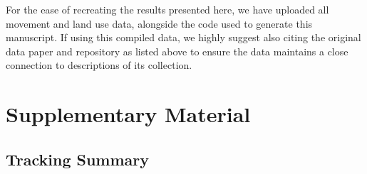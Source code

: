 \documentclass[10pt,a4paper]{article}
\begin{document}
For the ease of recreating the results presented here, we have uploaded all movement and land use data, alongside the code used to generate this manuscript.
If using this compiled data, we highly suggest also citing the original data paper and repository as listed above to ensure the data maintains a close connection to descriptions of its collection.

\section{Supplementary Material}\label{supplementary-material}

\subsection{Tracking Summary}\label{tracking-summary-1}
\end{document}

